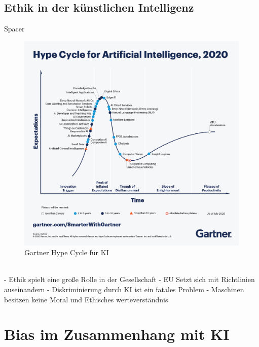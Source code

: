 \begin{onehalfspace}
    \subsection{Ethik in der künstlichen Intelligenz}
    \label{subsubsec:ethikinderKI}
        Spacer
        \\
        \begin{figure}[h]
            \centering
            \includegraphics[width = \textwidth]{Bilder/Gartner_hypeCycle.png}
            \caption{Gartner Hype Cycle für \ac*{KI}\cite{Goasduff2020}}
            \label{fig:HypeCycle}
        \end{figure}
        \\
        - Ethik spielt eine große Rolle in der Gesellschaft
        - EU Setzt sich mit Richtlinien auseinandern
        - Diskriminierung durch KI ist ein fatales Problem
        - Maschinen besitzen keine Moral und Ethisches werteverständnis
        \cite{Cremers2019} \cite{Beckert2021} \cite{Hallensleben2020} \cite{HEGKI2019}


    \newpage
    \section{Bias im Zusammenhang mit \ac{KI}}
    \label{subsec:KIundbias}

\end{onehalfspace}
